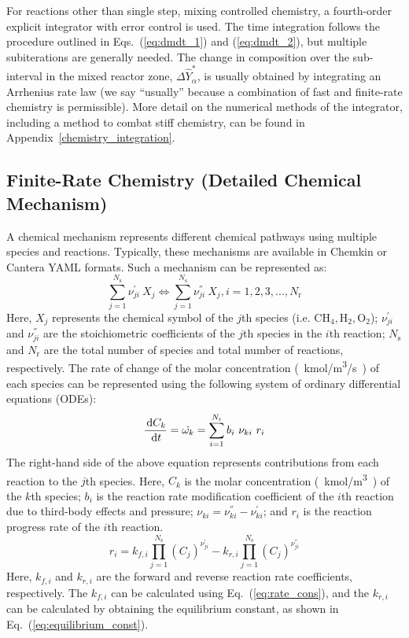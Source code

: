 For reactions other than single step, mixing controlled chemistry, a fourth-order explicit integrator with error control is used. The time integration follows the procedure outlined in Eqs.~(\ref{eq:dmdt_1}) and (\ref{eq:dmdt_2}), but multiple subiterations are generally needed. The change in composition over the sub-interval in the mixed reactor zone, $\Delta \hat{Y}_\alpha^*$, is usually obtained by integrating an Arrhenius rate law (we say ``usually'' because a combination of fast and finite-rate chemistry is permissible). More detail on the numerical methods of the integrator, including a method to combat stiff chemistry, can be found in Appendix~\ref{chemistry_integration}.


\subsection{Finite-Rate Chemistry (Detailed Chemical Mechanism)}
\label{detailed_chemistry_using_mechanism}
A chemical mechanism represents different chemical pathways using multiple species and reactions. Typically, these mechanisms are available in Chemkin or Cantera YAML formats. Such a mechanism can be represented as:
\begin{equation}\label{eq:chemistry_mechanism}
\sum_{j=1}^{N_{\text{s}}}{\nu}_{ji}^{'} \ X_j \Leftrightarrow \sum_{j=1}^{N_{\text{s}}}{\nu}_{ji}^{''} \ X_j, i=1,2,3,...,N_\text{r}
\end{equation}
Here, $X_j$ represents the chemical symbol of the $j$th species (i.e. $\mathrm{CH_4, H_2, O_2}$); ${\nu}_{ji}^{'}$ and ${\nu}_{ji}^{''}$ are the stoichiometric coefficients of the $j$th species in the $i$th reaction; ${N_{\text{s}}}$ and ${N_\text{r}}$ are the total number of species and total number of reactions, respectively.
The rate of change of the molar concentration \unit{(kmol/m^3/s)} of each species can be represented using the following system of ordinary differential equations (ODEs):
\begin{equation}\label{eq:chemistry_ode_system}
\frac{\d C_k}{\d t} =  \dot{\omega_k} = \sum_{i=1}^{N_\text{r}} b_{i} \ \nu_{ki} \ r_i
\end{equation}
The right-hand side of the above equation represents contributions from each reaction to the $j$th species. Here, $C_k$ is the molar concentration \si {(kmol/m^3)} of the $k$th species; $b_i$ is the reaction rate modification coefficient of the $i$th reaction due to third-body effects and pressure; $\nu_{ki} = {\nu}_{ki}^{''} - {\nu}_{ki}^{'}$; and $r_i$ is the reaction progress rate of the $i$th reaction.
\begin{equation}\label{eq:reaction_progress_rate}
r_i =  k_{f,i} \prod_{j=1}^{N_{\text{s}}} (C_j)^{{\nu}_{ji}^{'}}  -  k_{r,i} \prod_{j=1}^{N_{\text{s}}} (C_j)^{{\nu}_{ji}^{''}}
\end{equation}
Here, $k_{f,i}$ and $k_{r,i}$ are the forward and reverse reaction rate coefficients, respectively. The $k_{f,i}$ can be calculated using Eq.~(\ref{eq:rate_cons}), and the $k_{r,i}$ can be calculated by obtaining the equilibrium constant, as shown in Eq.~(\ref{eq:equilibrium_const}).

